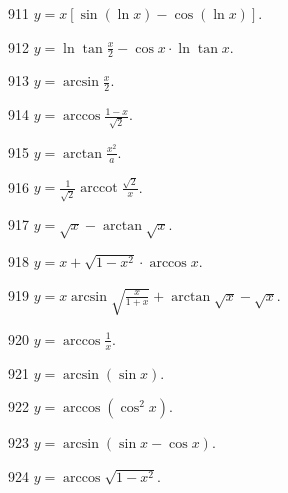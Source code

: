 \begin{prob}[S]{911}
$y = x[\sin(\ln x) - \cos(\ln x)]$.
\end{prob}

\begin{prob}[S]{912}
$y = \ln\tan\frac{x}{2} - \cos x \cdot \ln\tan x$.
\end{prob}

\begin{prob}[S]{913}
$y = \arcsin\frac{x}{2}$.
\end{prob}

\begin{prob}[S]{914}
$y = \arccos\frac{1 - x}{\sqrt{2}}$.
\end{prob}

\begin{prob}[S]{915}
$y = \arctan\frac{x^2}{a}$.
\end{prob}

\begin{prob}[S]{916}
$y = \frac{1}{\sqrt{2}}\operatorname{arccot}\frac{\sqrt{2}}{x}$.
\end{prob}

\begin{prob}[S]{917}
$y = \sqrt{x} - \arctan\sqrt{x}$.
\end{prob}

\begin{prob}[S]{918}
$y = x + \sqrt{1 - x^2}\cdot\arccos x$.
\end{prob}

\begin{prob}[S]{919}
$y = x\arcsin\sqrt{\frac{x}{1 + x}} + \arctan\sqrt{x} - \sqrt{x}$.
\end{prob}

\begin{prob}[S]{920}
$y = \arccos\frac{1}{x}$.
\end{prob}

\begin{prob}[S]{921}
$y = \arcsin(\sin x)$.
\end{prob}

\begin{prob}[S]{922}
$y = \arccos(\cos^2 x)$.
\end{prob}

\begin{prob}[S]{923}
$y = \arcsin(\sin x - \cos x)$.
\end{prob}

\begin{prob}[S]{924}
$y = \arccos\sqrt{1 - x^2}$.
\end{prob}

